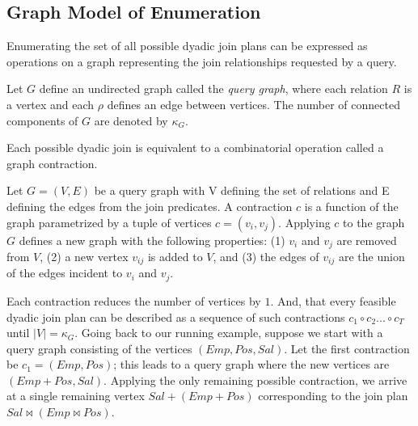 

\subsection{Graph Model of Enumeration}

Enumerating the set of all possible dyadic join plans can be expressed as operations on a graph representing the join relationships requested by a query.

\begin{definition}
Let $G$ define an undirected graph called the \emph{query graph}, where each relation $R$ is a vertex and each $\rho$ defines an edge between vertices. The number of connected components of $G$ are denoted by $\kappa_G$.
\end{definition}

Each possible dyadic join is equivalent to a combinatorial operation called a graph contraction.

\begin{definition}[Contraction]
Let $G = (V,E)$ be a query graph with V defining the set of relations and E defining the edges from the join predicates. A contraction $c$ is a function of the graph parametrized by a tuple of vertices $c=(v_i, v_j)$. Applying $c$ to the graph $G$ defines a new graph with the following properties: (1) $v_i$ and $v_j$ are removed from $V$, (2) a new vertex $v_{ij}$ is added to $V$, and (3) the edges of $v_{ij}$ are the union of the edges incident to $v_i$ and $v_j$. 
\end{definition}

Each contraction reduces the number of vertices by $1$.  And, that every feasible dyadic join plan can be described as a sequence of such contractions $c_1 \circ c_2 ...\circ c_{T}$ until $|V| = \kappa_G$. Going back to our running example, suppose we start with a query graph consisting of the vertices $(Emp, Pos, Sal)$. Let the first contraction be $c_1 = (Emp, Pos)$; this leads to a query graph where the new vertices are $(Emp+Pos, Sal)$.  Applying the only remaining possible contraction, we arrive at a single remaining vertex $Sal+(Emp+Pos)$ corresponding to the join plan $Sal \bowtie (Emp \bowtie Pos)$. 

